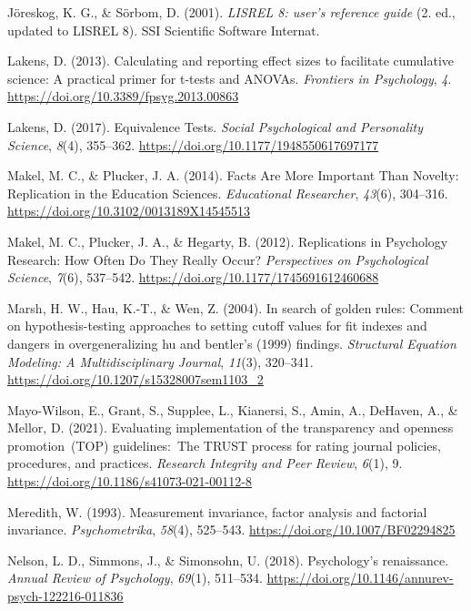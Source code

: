 \documentclass[
  man]{apa7}
\newlength{\cslhangindent}
\newenvironment{CSLReferences}[2] %
 {\begin{list}{}{%
  \setlength{\itemindent}{0pt}
  \setlength{\leftmargin}{0pt}
  \setlength{\parsep}{0pt}
  \ifodd #1
   \setlength{\leftmargin}{\cslhangindent}
   \setlength{\itemindent}{-1\cslhangindent}
  \fi
  \setlength{\itemsep}{#2\baselineskip}}}
 {\end{list}}
\begin{document}
\begin{CSLReferences}{1}{0}
Jöreskog, K. G., \& Sörbom, D. (2001). \emph{LISREL 8: user's reference guide} (2. ed., updated to LISREL 8). SSI Scientific Software Internat.

Lakens, D. (2013). Calculating and reporting effect sizes to facilitate cumulative science: A practical primer for t-tests and ANOVAs. \emph{Frontiers in Psychology}, \emph{4}. \url{https://doi.org/10.3389/fpsyg.2013.00863}

Lakens, D. (2017). Equivalence Tests. \emph{Social Psychological and Personality Science}, \emph{8}(4), 355--362. \url{https://doi.org/10.1177/1948550617697177}

Makel, M. C., \& Plucker, J. A. (2014). Facts Are More Important Than Novelty: Replication in the Education Sciences. \emph{Educational Researcher}, \emph{43}(6), 304--316. \url{https://doi.org/10.3102/0013189X14545513}

Makel, M. C., Plucker, J. A., \& Hegarty, B. (2012). Replications in Psychology Research: How Often Do They Really Occur? \emph{Perspectives on Psychological Science}, \emph{7}(6), 537--542. \url{https://doi.org/10.1177/1745691612460688}

Marsh, H. W., Hau, K.-T., \& Wen, Z. (2004). In search of golden rules: Comment on hypothesis-testing approaches to setting cutoff values for fit indexes and dangers in overgeneralizing hu and bentler's (1999) findings. \emph{Structural Equation Modeling: A Multidisciplinary Journal}, \emph{11}(3), 320--341. \url{https://doi.org/10.1207/s15328007sem1103_2}

Mayo-Wilson, E., Grant, S., Supplee, L., Kianersi, S., Amin, A., DeHaven, A., \& Mellor, D. (2021). Evaluating implementation of the transparency and openness promotion~(TOP) guidelines:~The TRUST process for rating journal policies, procedures, and practices. \emph{Research Integrity and Peer Review}, \emph{6}(1), 9. \url{https://doi.org/10.1186/s41073-021-00112-8}

Meredith, W. (1993). Measurement invariance, factor analysis and factorial invariance. \emph{Psychometrika}, \emph{58}(4), 525--543. \url{https://doi.org/10.1007/BF02294825}

Nelson, L. D., Simmons, J., \& Simonsohn, U. (2018). Psychology's renaissance. \emph{Annual Review of Psychology}, \emph{69}(1), 511--534. \url{https://doi.org/10.1146/annurev-psych-122216-011836}


\end{CSLReferences}
\end{document}
